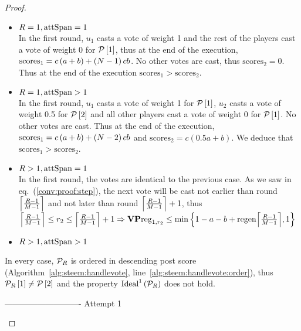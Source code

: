 \begin{proof}
\begin{itemize}
    \begin{itemize}
      \item $\rounds = 1, \attspan = 1$ \\
      In the first round, $u_1$ casts a vote of weight 1 and the rest of the
      players cast a vote of weight 0 for $\postlist\left[1\right]$, thus at the
      end of the execution, $\mathrm{scores}_1 = c \left(a + b\right) +
      \left(\playerlen - 1\right) c b$. No other votes are cast, thus
      $\mathrm{scores}_2 = 0$. Thus at the end of the execution
      $\mathrm{scores}_1 > \mathrm{scores}_2$.

      \item $\rounds = 1, \attspan > 1$ \\
      In the first round, $u_1$ casts a vote of weight 1 for
      $\postlist\left[1\right]$, $u_2$ casts a vote of weight 0.5 for
      $\postlist\left[2\right]$ and all other players cast a vote of weight 0
      for $\postlist\left[1\right]$. No other votes are cast. Thus at the end of
      the execution, $\mathrm{scores}_1 = c\left(a + b\right) + \left(\playerlen
      - 2\right) c b$ and $\mathrm{scores}_2 = c\left(0.5a + b\right)$. We
      deduce that $\mathrm{scores}_1 > \mathrm{scores}_2$.

      \item $\rounds > 1, \attspan = 1$ \\
      In the first round, the votes are identical to the previous case. As we
      saw in eq.~(\ref{conv:proof:step}), the next vote will be cast not earlier
      than round $\ceil*{\frac{\rounds - 1}{\postlen - 1}}$ and not later than
      round $\ceil*{\frac{\rounds - 1}{\postlen - 1}} + 1$, thus
      $\ceil*{\frac{\rounds - 1}{\postlen - 1}} \leq \round_2 \leq
      \ceil*{\frac{\rounds - 1}{\postlen - 1}} + 1 \Rightarrow \votpowvecreg_{1,
      \round_2} \leq \min{\left\{1 - a - b + \regen\ceil*{\frac{\rounds -
      1}{\postlen - 1}}, 1\right\}}$

      \item $\rounds > 1, \attspan > 1$ \\
    \end{itemize}
    In every case, $\postlist_\rounds$ is ordered in descending post score
    (Algorithm~\ref{alg:steem:handlevote},
    line~\ref{alg:steem:handlevote:order}), thus
    $\postlist_\rounds\left[1\right] \neq \postlist\left[2\right]$ and the
    property $\mathrm{Ideal}^1\left(\postlist_\rounds\right)$ does not hold.

    ---------------------------- Attempt 1


\end{itemize}
\end{proof}
